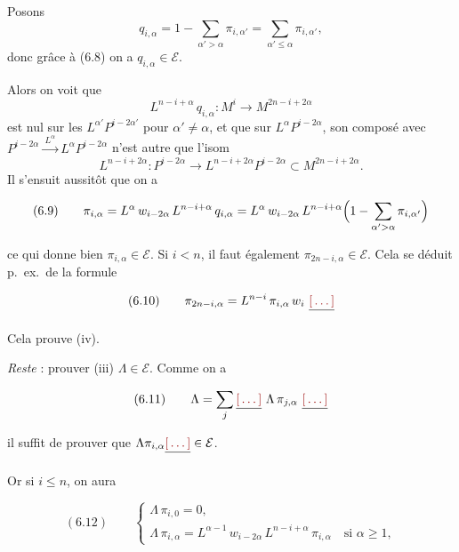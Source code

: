 \documentclass[11pt,a4paper]{article}
\begin{document}

Posons
\[ q_{i,\alpha} = 1 - \sum_{\alpha' > \alpha} \pi_{i,\alpha'} = \sum_{\alpha' \leqslant \alpha} \pi_{i,\alpha'} , \]
donc grâce à (6.8) on a $q_{i,\alpha} \in \mathcal{E}$.


Alors on voit que
\[ L^{n-i+\alpha}\, q_{i,\alpha} \colon M^{i} \longrightarrow M^{2n-i+2\alpha} \]
est nul sur les $L^{\alpha'} P^{i-2\alpha'}$ pour $\alpha' \neq \alpha$, et que
sur $L^{\alpha} P^{i-2\alpha}$,  son composé avec
$P^{i-2\alpha} \xrightarrow{\ L^{\alpha}\ } L^{\alpha} P^{i-2\alpha}$ n'est autre
que l'isom
\[ L^{n-i+2\alpha} \colon P^{i-2\alpha} \longrightarrow L^{n-i+2\alpha} P^{i-2\alpha} \subset M^{2n-i+2\alpha} . \]
Il s'ensuit aussitôt que on a

\[ (6.9) \qquad \pi_{i,\alpha} = L^{\alpha}\, w_{i-2\alpha}\, L^{n-i+\alpha}\, q_{i,\alpha} = L^{\alpha}\, w_{i-2\alpha}\, L^{n-i+\alpha}\Bigl( 1 - \sum_{\alpha' > \alpha} \pi_{i,\alpha'} \Bigr) \]

ce qui donne bien $\pi_{i,\alpha} \in \mathcal{E}$. 
Si $i < n$, il faut également $\pi_{2n-i,\alpha} \in \mathcal{E}$. Cela
se déduit p.\ ex.\ de la formule

\[ (6.10) \qquad \pi_{2n-i,\alpha} = L^{n-i}\, \pi_{i,\alpha}\, w_{i} \ \struck{\ill{}} \]

Cela prouve  (iv).

\emph{Reste} : prouver (iii) $\Lambda \in \mathcal{E}$. Comme on a

\[ (6.11) \qquad \Lambda = \sum_{j} \struck{\ill{}}\ \Lambda\, \pi_{j,\alpha}\ \struck{\ill{}} \]

il suffit de prouver que $\Lambda \pi_{i,\alpha} \struck{\ill{}} \in \mathcal{E}$.


Or si $i \leqslant n$, on aura

\[ (6.12) \qquad \begin{cases} \Lambda\, \pi_{i,0} = 0 , \\[2pt] \Lambda\, \pi_{i,\alpha} = L^{\alpha-1}\, w_{i-2\alpha}\, L^{n-i+\alpha}\, \pi_{i,\alpha} \quad \text{si } \alpha \geqslant 1 , \end{cases} \]
\end{document}
